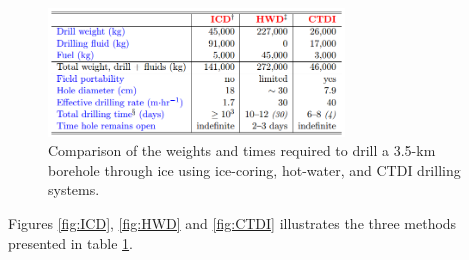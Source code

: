 \begin{figure}[htb]
  \centering
  \includegraphics[width=0.7\textwidth]{figures/mlh/table_ice_core_drilling}
  \caption{Comparison of the weights and times required to drill a 3.5-km borehole through ice using ice-coring, hot-water, and CTDI drilling systems. \cite{Gari2002Drill}}
  \label{tab:ice_core_drilling}
\end{figure}

Figures \ref{fig:ICD}, \ref{fig:HWD} and \ref{fig:CTDI} illustrates the three methods presented in table \ref{tab:ice_core_drilling}.

